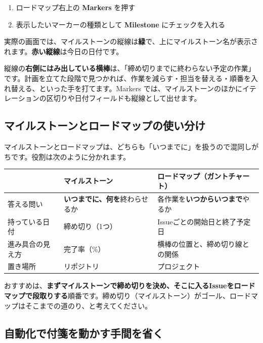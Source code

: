 \begin{enumerate}[leftmargin=1.6em]
  \item ロードマップ右上の \textbf{Markers} を押す
  \item 表示したいマーカーの種類として \textbf{Milestone} にチェックを入れる
\end{enumerate}

実際の画面では、マイルストーンの縦線は\textbf{緑}で、上にマイルストーン名が表示されます。\textbf{赤い縦線}は今日の日付です。

縦線の\textbf{右側にはみ出している横棒}は、「締め切りまでに終わらない予定の作業」です。計画を立てた段階で見つかれば、作業を減らす・担当を替える・順番を入れ替える、といった手を打てます。Markers では、マイルストーンのほかにイテレーションの区切りや日付フィールドも縦線として出せます。

\subsection{マイルストーンとロードマップの使い分け}

マイルストーンとロードマップは、どちらも「いつまでに」を扱うので混同しがちです。役割は次のように分かれます。

\begin{center}
\begin{tabularx}{\linewidth}{@{}>{\raggedright\arraybackslash}p{2.6cm} X X@{}}
\toprule
 & マイルストーン & ロードマップ（ガントチャート） \\
\midrule
答える問い & \textbf{いつまでに、何を}終わらせるか & 各作業を\textbf{いつからいつまで}やるか \\
持っている日付 & 締め切り（1つ） & Issueごとの開始日と終了予定日 \\
進み具合の見え方 & 完了率（\%） & 横棒の位置と、締め切り線との関係 \\
置き場所 & リポジトリ & プロジェクト \\
\bottomrule
\end{tabularx}
\end{center}

\medskip

おすすめは、\textbf{まずマイルストーンで締め切りを決め、そこに入るIssueをロードマップで段取りする}順番です。締め切り（マイルストーン）がゴール、ロードマップはそこまでの道のり、と考えてください。

\subsection{自動化で付箋を動かす手間を省く}

